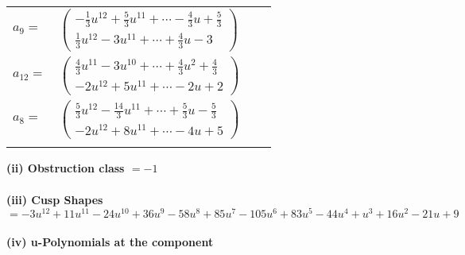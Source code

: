 \documentclass[1p]{elsarticle_modified}
\theoremstyle{definition}
\begin{document}
\begin{tabular}{m{7pt} m{180pt} m{7pt} m{180pt} }
\flushright $a_{9}=$&$\begin{pmatrix}-\frac{1}{3} u^{12}+\frac{5}{3} u^{11}+\cdots-\frac{4}{3} u+\frac{5}{3}\\\frac{1}{3} u^{12}-3 u^{11}+\cdots+\frac{4}{3} u-3\end{pmatrix}$ \\
\flushright $a_{12}=$&$\begin{pmatrix}\frac{4}{3} u^{11}-3 u^{10}+\cdots+\frac{4}{3} u^2+\frac{4}{3}\\-2 u^{12}+5 u^{11}+\cdots-2 u+2\end{pmatrix}$ \\
\flushright $a_{8}=$&$\begin{pmatrix}\frac{5}{3} u^{12}-\frac{14}{3} u^{11}+\cdots+\frac{5}{3} u-\frac{5}{3}\\-2 u^{12}+8 u^{11}+\cdots-4 u+5\end{pmatrix}$\\&\end{tabular}
\flushleft \textbf{(ii) Obstruction class $= -1$}\\~\\
\flushleft \textbf{(iii) Cusp Shapes $= -3 u^{12}+11 u^{11}-24 u^{10}+36 u^9-58 u^8+85 u^7-105 u^6+83 u^5-44 u^4+u^3+16 u^2-21 u+9$}\\~\\
\newpage\renewcommand{\arraystretch}{1}
\flushleft \textbf{(iv) u-Polynomials at the component}\newline \\
\end{document}
